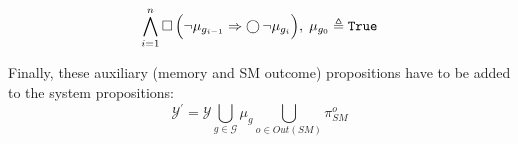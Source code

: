 \begin{equation}\label{GoalOrderFormula}
	\bigwedge \limits_{i = 1}^n \operatorname{\Box} \Big(  \lnot \mu_{g_{i-1}} \Rightarrow \operatorname{\bigcirc} \lnot \mu_{g_i} \Big), \; \mu_{g_0} \triangleq \texttt{True}
\end{equation}

Finally, these auxiliary (memory and SM outcome) propositions have to be added to the system propositions: $$\mathcal{Y}^\prime = \mathcal{Y} \bigcup \limits_{g \in \mathcal{G}} \mu_g \bigcup \limits_{o \in Out(SM)} \pi_{SM}^o$$

